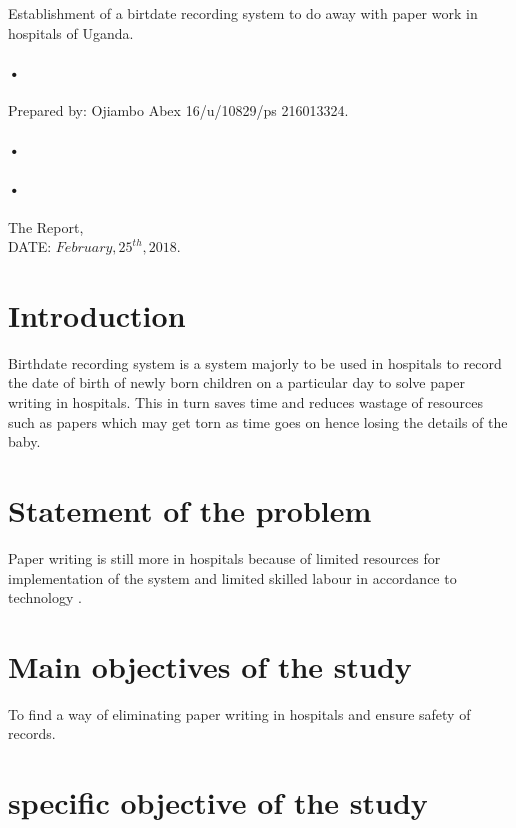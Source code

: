 \documentclass[12pt,]{article}
\begin{document}
\begin{titlepage}
\centerline{Establishment of a birtdate recording system to do away with paper work in hospitals of Uganda.\\}
\paragraph*{•}
\centerline{  Prepared by:  Ojiambo Abex 16/u/10829/ps 216013324.\\}
\paragraph*{•}
\paragraph*{•}
  \begin{flushright}
  The Report,\\
  DATE: $February,25^{th},2018$.
 \tableofcontents

  \end{flushright}
\date{\today}
\end{titlepage}

\newpage





\section{Introduction}
Birthdate recording system is a system majorly to be used in hospitals to record the date of birth of newly born children on a particular day to solve paper writing in hospitals. This in turn saves time and reduces wastage of resources such as papers which may get torn as time goes on hence losing the details of the baby.
\section{Statement of the problem}
Paper writing is still more in hospitals because of limited resources for implementation of the system and limited skilled labour in accordance to technology .
\section{Main objectives of the study}
To find a way of eliminating paper writing in hospitals and ensure safety of records.
\section{specific objective of the study}
\end{document}
